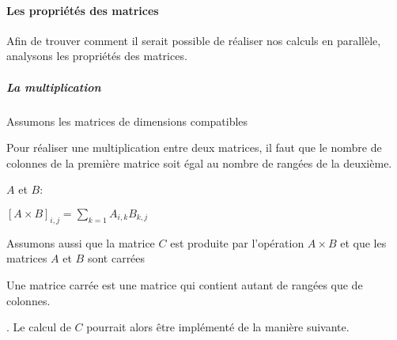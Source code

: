 \documentclass[letterpaper,10pt,french]{sphinxmanual}
\begin{document}
\paragraph{Les propriétés des matrices}
\label{\detokenize{preprocessing:les-proprietes-des-matrices}}
Afin de trouver comment il serait possible de réaliser nos calculs en parallèle, analysons les propriétés des matrices.


\subparagraph{La multiplication}
\label{\detokenize{preprocessing:la-multiplication}}
Assumons les matrices de dimensions compatibles%
\begin{footnote}[19]\sphinxAtStartFootnote
Pour réaliser une multiplication entre deux matrices, il faut que le nombre de colonnes de la première matrice soit égal au nombre de rangées de la deuxième.
%
\end{footnote} \(A\) et \(B\):

\([A \times B]_{i,j} = \displaystyle\sum_{k=1}A_{i,k}B_{k,j}\)

Assumons aussi que la matrice \(C\) est produite par l’opération \(A \times B\) et que les matrices \(A\) et \(B\) sont carrées%
\begin{footnote}[20]\sphinxAtStartFootnote
Une matrice carrée est une matrice qui contient autant de rangées que de colonnes.
%
\end{footnote}.  Le calcul de \(C\) pourrait alors être implémenté de la manière suivante.

\begin{sphinxVerbatim}[commandchars=\\\{\}]
  \PYG{p}{[}\PYG{p}{[}\PYG{p}{]}
    \PYG{p}{[}\PYG{p}{]}
    \PYG{p}{[}\PYG{p}{]}\PYG{p}{]}
   
	   \PYG{p}{[}\PYG{p}{]}
		   \PYG{p}{)}
			\PYG{p}{[}\PYG{p}{]}\PYG{p}{[}\PYG{p}{]}  \PYG{p}{[}\PYG{p}{]}\PYG{p}{[}\PYG{p}{]}  \PYG{p}{[}\PYG{p}{]}\PYG{p}{[}\PYG{p}{]}
\end{sphinxVerbatim}
\end{document}
